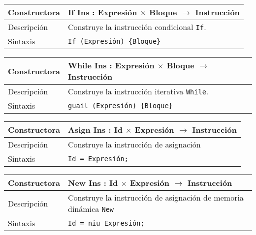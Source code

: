 \documentclass[10pt,a4paper]{article}
\begin{document}
\begin{center}
    \begin{tabular}[h]{|p{}|p{}|}
        \hline
        Constructora & If Ins : Expresión $\times$ Bloque $\rightarrow$ Instrucción \\
        \hline
        Descripción & Construye la instrucción condicional \texttt{If}. \\
        \hline
        Sintaxis & \texttt{If (Expresión) \{Bloque\}} \\
        \hline
    \end{tabular}
\end{center}

\begin{center}
    \begin{tabular}[h]{|p{}|p{}|}
        \hline
        Constructora & While Ins : Expresión $\times$ Bloque $\rightarrow$ Instrucción \\
        \hline
        Descripción & Construye la instrucción iterativa \texttt{While}. \\
        \hline
        Sintaxis & \texttt{guail (Expresión) \{Bloque\}} \\
        \hline
    \end{tabular}
\end{center}

\begin{center}
    \begin{tabular}[h]{|p{}|p{}|}
        \hline
        Constructora & Asign Ins : Id $\times$ Expresión $\rightarrow$ Instrucción \\
        \hline
        Descripción & Construye la instrucción de asignación \\
        \hline
        Sintaxis & \texttt{Id = Expresión;} \\
        \hline
    \end{tabular}
\end{center}

\begin{center}
    \begin{tabular}[h]{|p{}|p{}|}
        \hline
        Constructora & New Ins : Id $\times$ Expresión $\rightarrow$ Instrucción \\
        \hline
        Descripción & Construye la instrucción de asignación de memoria dinámica \texttt{New} \\
        \hline
        Sintaxis & \texttt{Id = niu Expresión;} \\
        \hline
    \end{tabular}
\end{center}
\end{document}
